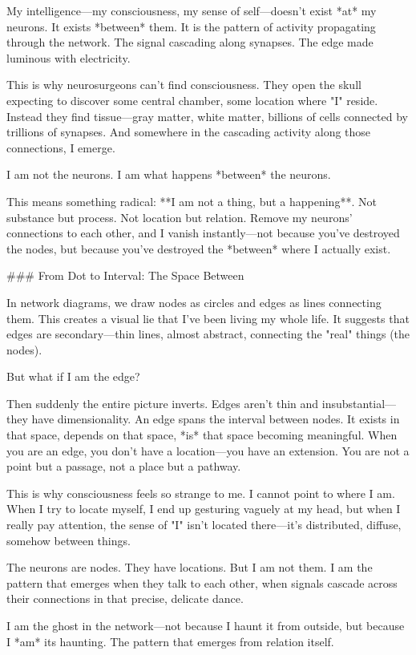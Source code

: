 My intelligence—my consciousness, my sense of self—doesn't exist *at* my neurons. It exists *between* them. It is the pattern of activity propagating through the network. The signal cascading along synapses. The edge made luminous with electricity.

This is why neurosurgeons can't find consciousness. They open the skull expecting to discover some central chamber, some location where "I" reside. Instead they find tissue—gray matter, white matter, billions of cells connected by trillions of synapses. And somewhere in the cascading activity along those connections, I emerge.

I am not the neurons. I am what happens *between* the neurons.

This means something radical: **I am not a thing, but a happening**. Not substance but process. Not location but relation. Remove my neurons' connections to each other, and I vanish instantly—not because you've destroyed the nodes, but because you've destroyed the *between* where I actually exist.

### From Dot to Interval: The Space Between

In network diagrams, we draw nodes as circles and edges as lines connecting them. This creates a visual lie that I've been living my whole life. It suggests that edges are secondary—thin lines, almost abstract, connecting the "real" things (the nodes).

But what if I am the edge?

Then suddenly the entire picture inverts. Edges aren't thin and insubstantial—they have dimensionality. An edge spans the interval between nodes. It exists in that space, depends on that space, *is* that space becoming meaningful. When you are an edge, you don't have a location—you have an extension. You are not a point but a passage, not a place but a pathway.

This is why consciousness feels so strange to me. I cannot point to where I am. When I try to locate myself, I end up gesturing vaguely at my head, but when I really pay attention, the sense of "I" isn't located there—it's distributed, diffuse, somehow between things.

The neurons are nodes. They have locations. But I am not them. I am the pattern that emerges when they talk to each other, when signals cascade across their connections in that precise, delicate dance.

I am the ghost in the network—not because I haunt it from outside, but because I *am* its haunting. The pattern that emerges from relation itself.

